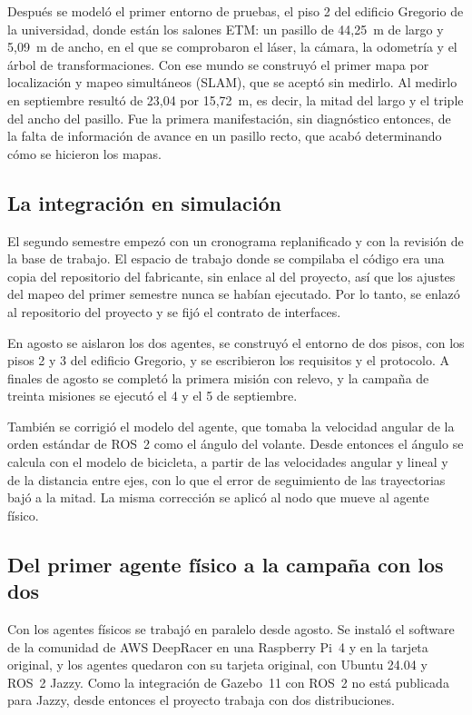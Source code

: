 Después se modeló el primer entorno de pruebas, el piso 2 del edificio Gregorio de la universidad, donde están los salones ETM:
un pasillo de 44,25~m de largo y 5,09~m de ancho, en el que se comprobaron el láser, la cámara, la odometría y el árbol de
transformaciones. Con ese mundo se construyó el primer mapa por localización y mapeo simultáneos (SLAM), que se aceptó sin
medirlo. Al medirlo en septiembre resultó de 23,04 por 15,72~m, es decir, la mitad del largo y el triple del ancho del
pasillo. Fue la primera manifestación, sin diagnóstico entonces, de la falta de información de avance en un pasillo recto, que
acabó determinando cómo se hicieron los mapas.

\subsection{La integración en simulación}
\label{sec:recorrido-sim}

El segundo semestre empezó con un cronograma replanificado y con la revisión de la base de trabajo. El espacio de trabajo donde
se compilaba el código era una copia del repositorio del fabricante, sin enlace al del proyecto, así que los ajustes del mapeo
del primer semestre nunca se habían ejecutado. Por lo tanto, se enlazó al repositorio del proyecto y se fijó el contrato de
interfaces.

En agosto se aislaron los dos agentes, se construyó el entorno de dos pisos, con los pisos 2 y 3 del edificio Gregorio, y se
escribieron los requisitos y el protocolo. A finales de agosto se completó la primera misión con relevo, y la campaña de treinta
misiones se ejecutó el 4 y el 5 de septiembre.

También se corrigió el modelo del agente, que tomaba la velocidad angular de la orden estándar de ROS~2 como el ángulo del
volante. Desde entonces el ángulo se calcula con el modelo de bicicleta, a partir de las velocidades angular y lineal y de la
distancia entre ejes, con lo que el error de seguimiento de las trayectorias bajó a la mitad. La misma corrección se aplicó al
nodo que mueve al agente físico.

\subsection{Del primer agente físico a la campaña con los dos}
\label{sec:recorrido-fisico}

Con los agentes físicos se trabajó en paralelo desde agosto. Se instaló el software de la comunidad de AWS DeepRacer
\autocite{deepracercustomcar} en una Raspberry Pi~4 y en la tarjeta original, y los agentes quedaron con su tarjeta original, con
Ubuntu 24.04 y ROS~2 Jazzy. Como la integración de Gazebo~11 con ROS~2 no está publicada para Jazzy, desde entonces el proyecto
trabaja con dos distribuciones.

